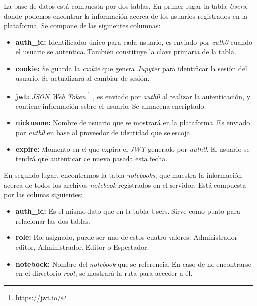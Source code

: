 \documentclass[11pt,spanish,listoffigures]{tfgetsinf}
\begin{document}
La base de datos está compuesta por dos tablas. En primer lugar la tabla \textit{Users}, donde podemos encontrar la información acerca de los usuarios registrados en la plataforma. Se compone de las siguientes columnas:

\begin{itemize}

\item \textbf{auth\_id:} Identificador único para cada usuario, es enviado por \textit{auth0} cuando el usuario se autentica. También constituye la clave primaria de la tabla.

\item \textbf{cookie:} Se guarda la \textit{cookie} que genera \textit{Jupyter} para identificar la sesión del usuario. Se actualizará al cambiar de sesión.

\item \textbf{jwt:} \textit{JSON Web Token} \footnote{https://jwt.io/} , es enviado por \textit{auth0} al realizar la autenticación, y contiene información sobre el usuario. Se almacena encriptado.

\item \textbf{nickname:} Nombre de usuario que se mostrará en la plataforma. Es enviado por \textit{auth0} en base al proveedor de identidad que se escoja.

\item \textbf{expire:} Momento en el que expira el \textit{\gls{JWT}} generado por \textit{auth0}. El usuario se tendrá que autenticar de nuevo pasada esta fecha.

\end{itemize}

En segundo lugar, encontramos la tabla \textit{notebooks}, que muestra la información acerca de todos los archivos \textit{notebook} registrados en el servidor. Está compuesta por las colunas siguientes:

\begin{itemize}

\item \textbf{auth\_id:} Es el mismo dato que en la tabla Users. Sirve como punto para relacionar las dos tablas. 

\item \textbf{role:} Rol asignado, puede ser uno de estos cuatro valores: Administrador-editor, Administrador, Editor o Espectador.

\item \textbf{notebook:} Nombre del \textit{notebook} que se referencia. En caso de no encontrarse en el directorio \textit{root}, se mostrará la ruta para acceder a él.

\end{itemize}
\end{document}
